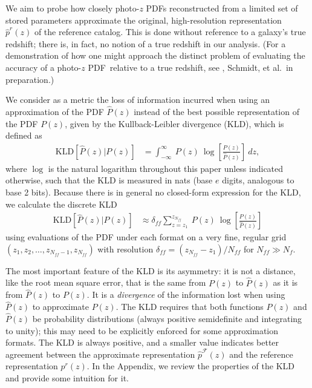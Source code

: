 \documentclass[\docopts]{\docclass}
\newcommand{\pz}{photo-$z$ PDF}
\begin{document}
We aim to probe how closely \pz s reconstructed from a limited set of stored 
parameters approximate the original, high-resolution representation 
$\hat{p}^{r}(z)$ of the reference catalog.
This is done without reference to a galaxy's true redshift; there is, in fact, 
no notion of a true redshift in our analysis.
(For a demonstration of how one might approach the distinct problem of 
evaluating the accuracy of a \pz\ relative to a true redshift, see 
\citet{polsterer_uncertain_2016}, Schmidt, et al.\ in preparation.)


We consider as a metric the loss of information incurred when using an 
approximation of the PDF $\hat{P}(z)$ instead of the best possible 
representation of the  PDF $P(z)$, given by the Kullback-Leibler divergence 
(KLD), which is defined as
\begin{align}
  \label{eq:kld}
  \mathrm{KLD}[\hat{P}(z) | P(z)] &= \int_{-\infty}^{\infty}\ P(z)\ 
\log\left[\frac{P(z)}{\hat{P}(z)}\right]\ dz,
\end{align}
where $\log$ is the natural logarithm throughout this paper unless indicated 
otherwise, such that the KLD is measured in nats (base $e$ digits, analogous to 
base 2 bits).
Because there is in general no closed-form expression for the KLD, we calculate 
the discrete KLD
\begin{align}
  \label{eq:kld_approx}
  \mathrm{KLD}[\hat{P}(z) | P(z)] &\approx 
\delta_{ff}\sum_{z=z_{1}}^{z_{N_{ff}}}\ P(z)\ 
\log\left[\frac{P(z)}{\hat{P}(z)}\right]
\end{align}
using evaluations of the PDF under each format on a very fine, regular grid 
$(z_{1}, z_{2}, \dots, z_{N_{ff}-1}, z_{N_{ff}})$ with resolution $\delta_{ff} 
= (z_{N_{ff}} -z_{1}) / N_{ff}$ for $N_{ff} \gg N_{f}$.

The most important feature of the KLD is its asymmetry: it is not a distance, 
like the root mean square error, that is the same from $P(z)$ to $\hat{P}(z)$ 
as it is from $\hat{P}(z)$ to $P(z)$.
It is a \textit{divergence} of the information lost when using $\hat{P}(z)$ to 
approximate $P(z)$.
The KLD requires that both functions $P(z)$ and $\hat{P}(z)$ be probability 
distributions (always positive semidefinite and integrating to unity); this may 
need to be explicitly enforced for some approximation formats.
The KLD is always positive, and a smaller value indicates better agreement 
between the approximate representation $\hat{p}^{\mathcal{F}}(z)$ and the 
reference representation $p^{r}(z)$.
In the Appendix, we review the properties of the KLD and provide some intuition 
for it.
\end{document}
